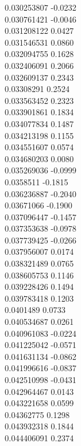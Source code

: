 {        0.030253807	-0.0232\\
        0.030761421	-0.0046\\
        0.031208122	0.0427\\
        0.031546531	0.0860\\
        0.032094755	0.1628\\
        0.032406091	0.2066\\
        0.032609137	0.2343\\
        0.03308291	0.2524\\
        0.033563452	0.2323\\
        0.033901861	0.1834\\
        0.034077834	0.1487\\
        0.034213198	0.1155\\
        0.034551607	0.0574\\
        0.034680203	0.0080\\
        0.035269036	-0.0999\\
        0.0358511	-0.1815\\
        0.036236887	-0.2040\\
        0.03671066	-0.1900\\
        0.037096447	-0.1457\\
        0.037353638	-0.0978\\
        0.037739425	-0.0266\\
        0.037956007	0.0174\\
        0.038321489	0.0765\\
        0.038605753	0.1146\\
        0.039228426	0.1494\\
        0.039783418	0.1203\\
        0.0401489	0.0733\\
        0.040534687	0.0261\\
        0.040961083	-0.0224\\
        0.041225042	-0.0571\\
        0.041631134	-0.0862\\
        0.041996616	-0.0837\\
        0.042510998	-0.0431\\
        0.042964467	0.0143\\
        0.043221658	0.0599\\
        0.04362775	0.1298\\
        0.043932318	0.1844\\
        0.044406091	0.2374\\
}
